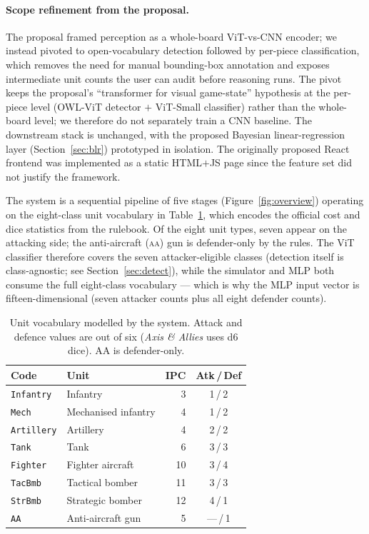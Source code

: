 \documentclass[10pt,twocolumn,letterpaper]{article}
\begin{document}
\paragraph{Scope refinement from the proposal.}
The proposal framed perception as a whole-board ViT-vs-CNN encoder;
we instead pivoted to open-vocabulary detection followed by
per-piece classification, which removes the need for manual
bounding-box annotation and exposes intermediate unit counts the
user can audit before reasoning runs. The pivot keeps the
proposal's ``transformer for visual game-state'' hypothesis at the
per-piece level (OWL-ViT detector $+$ ViT-Small classifier) rather
than the whole-board level; we therefore do not separately train a
CNN baseline. The downstream stack is unchanged, with the proposed
Bayesian linear-regression layer (Section~\ref{sec:blr}) prototyped
in isolation. The originally proposed React frontend was
implemented as a static HTML$+$JS page since the feature set did
not justify the framework.

The system is a sequential pipeline of five stages
(Figure~\ref{fig:overview}) operating on the eight-class unit
vocabulary in Table~\ref{tab:units}, which encodes the official cost
and dice statistics from the rulebook.
Of the eight unit types, seven appear on the attacking side; the
anti-aircraft (\textsc{aa}) gun is defender-only by the rules.
The ViT classifier therefore covers the seven attacker-eligible
classes (detection itself is class-agnostic; see
Section~\ref{sec:detect}), while the simulator and MLP both consume
the full eight-class vocabulary --- which is why the MLP input vector
is fifteen-dimensional (seven attacker counts plus all eight defender
counts).

\begin{table}[t]
\centering\small
\setlength{\tabcolsep}{4pt}
\caption{Unit vocabulary modelled by the system. Attack and defence
values are out of six (\emph{Axis \& Allies} uses d6 dice).
\textsc{AA} is defender-only.}
\label{tab:units}
\begin{tabular}{@{}llrc@{}}
\toprule
Code & Unit & IPC & Atk\,/\,Def \\
\midrule
\texttt{Infantry}  & Infantry             &  3 & 1\,/\,2 \\
\texttt{Mech}      & Mechanised infantry  &  4 & 1\,/\,2 \\
\texttt{Artillery} & Artillery            &  4 & 2\,/\,2 \\
\texttt{Tank}      & Tank                 &  6 & 3\,/\,3 \\
\texttt{Fighter}   & Fighter aircraft     & 10 & 3\,/\,4 \\
\texttt{TacBmb}    & Tactical bomber      & 11 & 3\,/\,3 \\
\texttt{StrBmb}    & Strategic bomber     & 12 & 4\,/\,1 \\
\texttt{AA}        & Anti-aircraft gun    &  5 & ---\,/\,1 \\
\bottomrule
\end{tabular}
\end{table}
\end{document}
